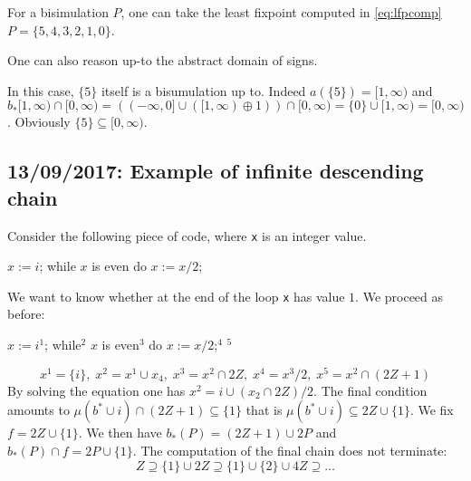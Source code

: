 \documentclass{llncs}
\begin{document}
For a bisimulation $P$, one can take the least fixpoint computed in \eqref{eq:lfpcomp} $P= \{5,4,3,2,1,0\}$.

\medskip
One can also reason up-to the abstract domain of signs.

In this case, $\{5\}$ itself is a bisumulation up to. Indeed $a(\{5\}) = [1,\infty)$ and  $ b_*[1,\infty) \cap [0,\infty) = ( (-\infty, 0] \cup ([1,\infty) \oplus1) ) \cap [0,\infty) = \{0\} \cup [1,\infty) = [0,\infty)$. Obviously $\{5\}\subseteq [0,\infty)$.

\subsection{13/09/2017: Example of infinite descending chain}
Consider the following piece of code, where \texttt{x} is an integer value.
\begin{codeNT}
$x := i$;  while $x$ is even  do { $x:=x/2$; }
\end{codeNT}
We want to know whether at the end of the loop \texttt{x} has value $1$.
We proceed as before:
\begin{codeNT}
$x := i$$^1$;  while$^2$ $x$ is even$^3$  do { $x:=x/2$;$^4$ }$^5$
\end{codeNT}
\begin{equation}
x^1=\{i\},  \; x^2 = x^1\cup x_4, \; x^3 = x^2 \cap 2Z, \; x^4 = x^3/2, \; x^5 = x^2 \cap (2Z+1)
\end{equation}
By solving the equation one has $x^2 = {i}\cup (x_2\cap 2Z)/2$. The final condition amounts to $\mu (b^*\cup i) \cap (2Z+1)\subseteq \{1\}$ that is $\mu (b^*\cup i)  \subseteq 2Z \cup \{1\}$. We fix $f = 2Z \cup \{1\}$.
We then have $b_*(P) =(2Z+1)\cup 2P$ and $b_*(P)\cap f = 2P \cup \{1\}$.
The computation of the final chain does not terminate:
$$Z\supseteq \{1\} \cup 2Z \supseteq \{1\} \cup \{2\} \cup 4Z \supseteq \dots$$
\end{document}
